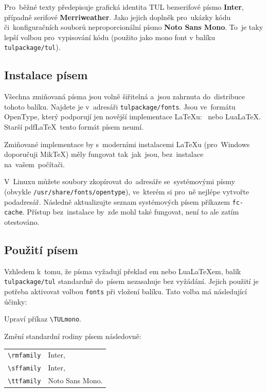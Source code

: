 \documentclass[a4paper,12pt,fonts,numbering,listingsleft]{./tulpackage/tularticle}
\makeatletter
\newcommand{\cmdfont}[1]{\texttt{\color{\tulcolor}#1}}
\newcommand{\cmdnoindex}[1]{\cmdfont{\textbackslash{}#1}}
\newcommand{\cmd}[1]{\cmdnoindex{#1}\index{#1@\textbackslash #1}}
\makeatother
\begin{document}
Pro~běžné texty předepisuje grafická identita TUL bezserifové písmo
\textbf{Inter}, případně serifové \textbf{Merriweather}.
Jako jejich doplněk pro~ukázky kódu či~konfiguračních souborů
neproporcionální písmo \textbf{Noto Sans Mono}. To~je taky lepší volbou
pro~vypisování kódu (použito jako mono font v balíku \cmdfont{tulpackage/tul}).

\subsection{Instalace písem}

Všechna zmiňovaná písma jsou volně šiřitelná a~jsou zahrnuta do~distribuce
tohoto balíku. Najdete je v~adresáři \cmdfont{tulpackage/fonts}. Jsou ve~formátu OpenType,
který podporují jen novější implementace \LaTeX{}u: \XeLaTeX\ nebo Lua\LaTeX.
Starší pdf\LaTeX\ tento formát písem neumí.

Zmiňované implementace by s~moderními instalacemi \LaTeX{}u (pro~Windows doporučuji Mik\TeX)
měly fungovat tak~jak~jsou, bez~instalace na~vašem~počítači.

V~Linuxu můžete soubory zkopírovat do~adresáře se~systémovými písmy (obvykle
\cmdfont{/usr/share/fonts/opentype}), ve~kterém si pro~ně nejlépe vytvořte
podadresář. Následně aktualizujte seznam systémových písem příkazem
\cmdfont{fc-cache}. Přístup bez~instalace by~zde mohl také fungovat,
není to ale zatím otestováno.

\clearpage

\subsection{Použití písem}

Vzhledem k~tomu, že písma vyžadují překlad \XeLaTeX{}em nebo Lua\LaTeX{}em, balík
\cmdfont{tulpackage/tul} standardně do~písem nezasahuje bez vyžádání.
Jejich použití je potřeba aktivovat volbou \cmdfont{fonts} při vložení balíku.
Tato volba má následující účinky:

\begin{itemize*}
    \item Upraví příkaz \cmd{TULmono}.
    \item Změní standardní rodiny písem následovně:\\
          \begin{tabular}{@{}ll}
              \cmdfont{\textbackslash{}rmfamily} & Inter,          \\
              \cmdfont{\textbackslash{}sffamily} & Inter,          \\
              \cmdfont{\textbackslash{}ttfamily} & Noto Sans Mono.
          \end{tabular}
\end{itemize*}
\end{document}
